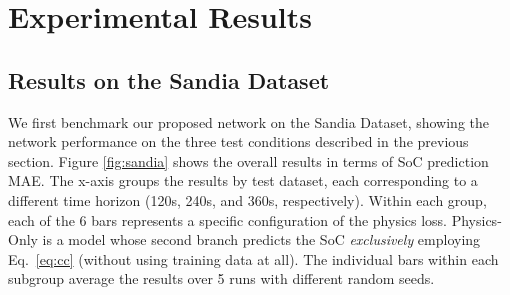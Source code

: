 \vspace{-0.1cm}
\section{Experimental Results}
\vspace{-0.1cm}
\label{sec:results}



\subsection{Results on the Sandia Dataset}
\vspace{-0.1cm}
We first benchmark our proposed network on the Sandia Dataset, showing the network performance on the three test conditions described in the previous section.
Figure \ref{fig:sandia} shows the overall results in terms of SoC prediction MAE. 
The x-axis groups the results by test dataset, each corresponding to a different time horizon (120s, 240s, and 360s, respectively). Within each group, each of the 6 bars represents a specific configuration of the physics loss. Physics-Only is a model whose second branch predicts the SoC \textit{exclusively} employing Eq.~\ref{eq:cc} (without using training data at all). The individual bars within each subgroup average the results over 5 runs with different random seeds.

